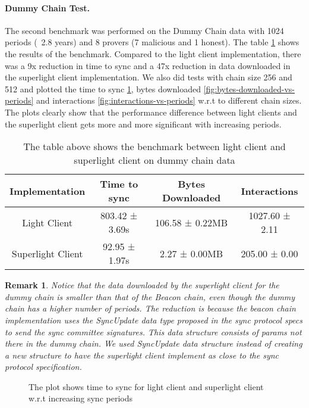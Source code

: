 \documentclass[a4paper,11pt,oneside]{article}
\newtheorem*{remark}{Remark}
\theoremstyle{definition}
\begin{document}
  \paragraph{Dummy Chain Test.} The second benchmark was performed on the Dummy Chain data with 1024 periods (~2.8 years) and 8 provers (7 malicious and 1 honest). The table \ref{table:dummy-chain} shows the results of the benchmark. Compared to the light client implementation, there was a 9x reduction in time to sync and a 47x reduction in data downloaded in the superlight client implementation. We also did tests with chain size 256 and 512 and plotted the time to sync \ref{fig:time-to-sync-vs-periods}, bytes downloaded \ref{fig:bytes-downloaded-vs-periods} and interactions \ref{fig:interactions-vs-periods} w.r.t to different chain sizes. The plots clearly show that the performance difference between light clients and the superlight client gets more and more significant with increasing periods.
  \begin{table}[h]
  \centering
  \begin{tabular}{|c | c |c | c|} 
  \hline
  Implementation & Time to sync & Bytes Downloaded & Interactions \\ [0.5ex] 
  \hline
  Light Client & 803.42 ± 3.69s & 106.58 ± 0.22MB & 1027.60 ± 2.11 \\
  Superlight Client & 92.95 ± 1.97s & 2.27 ± 0.00MB & 205.00 ± 0.00 \\ [0.5ex]  
  \hline
  \end{tabular}
  \caption{The table above shows the benchmark between light client and superlight client on dummy chain data}
  \label{table:dummy-chain}
  \end{table}
  
  \begin{remark}
  Notice that the data downloaded by the superlight client for the dummy chain is smaller than that of the Beacon chain, even though the dummy chain has a higher number of periods. The reduction is because the beacon chain implementation uses the SyncUpdate data type proposed in the sync protocol specs to send the sync committee signatures. This data structure consists of params not there in the dummy chain. We used SyncUpdate data structure instead of creating a new structure to have the superlight client implement as close to the sync protocol specification.
  \end{remark}

  \begin{figure}[H]
    \begin{center}
         \scalebox{.8}{}
    \end{center}
    \caption{The plot shows time to sync for light client and superlight client w.r.t increasing sync periods}
    \label{fig:time-to-sync-vs-periods}
  \end{figure}
  
\end{document}
